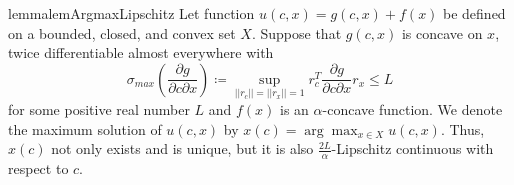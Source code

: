 \begin{restatable}{lemma}{lemArgmaxLipschitz}
\label{lem:argmax:Lipschitz}
Let function $u(c,x) = g(c,x) + f(x)$ be defined on a bounded, closed, and convex set $X$. Suppose that $g(c,x)$ is concave on $x$, twice differentiable almost everywhere with 
$$\sigma_{max}( \frac{\partial g}{\partial c\partial x} ) \coloneqq \sup_{||r_c|| = ||r_x|| = 1} r_c^T \frac{\partial g}{\partial c\partial x} r_x \le L$$ for some positive real number $L$ and $f(x)$ is an $\alpha$-concave function. We denote the maximum solution of $u(c, x)$ by $x(c) = \arg\max_{x\in X} u(c,x)$. Thus, $x(c)$ not only exists and is unique, but it is also $\frac{2L}{\alpha}$-Lipschitz continuous with respect to $c$.
\end{restatable}